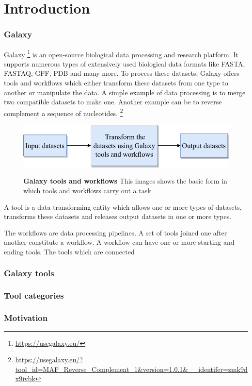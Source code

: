 \chapter{Introduction}\label{chap:introduction}
\subsection{Galaxy}
Galaxy {\footnote{\url{https://usegalaxy.eu/}}} is an open-source biological data processing and research platform. It supports numerous types of extensively used biological data formats like FASTA, FASTAQ, GFF, PDB and many more. To process these datasets, Galaxy offers tools and workflows which either transform these datasets from one type to another or manipulate the data. A simple example of data processing is to merge two compatible datasets to make one. Another example can be to reverse complement a sequence of nucleotides. \footnote{\url{https://usegalaxy.eu/?tool_id=MAF_Reverse_Complement_1&version=1.0.1&__identifer=zmk9dx9ivbk}}

\begin{figure}[h]
\begin{centering}
    {\includegraphics[scale=0.8]{figures/image_Galaxy_1.pdf}}
    \caption[Galaxy tools and workflows]{\textbf{Galaxy tools and workflows} This images shows the basic form in which tools and workflows carry out a task}
\end{centering}
\end{figure}

A tool is a data-transforming entity which allows one or more types of datasets, transforms these datasets and releases output datasets in one or more types.


The workflows are data processing pipelines. A set of tools joined one after another constitute a workflow. A workflow can have one or more starting and ending tools. The tools which are connected 



\subsection{Galaxy tools}

\subsection{Tool categories}

\subsection{Motivation}
